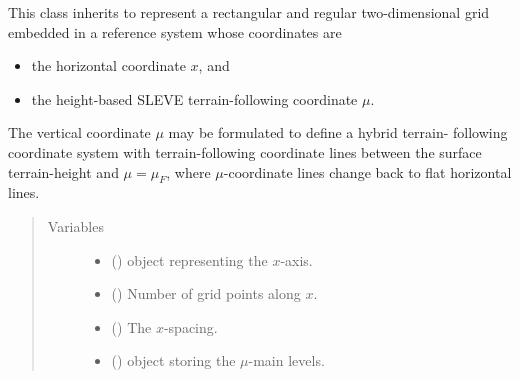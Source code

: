\documentclass[letterpaper,10pt,english]{sphinxmanual}
\begin{document}
\begin{fulllineitems}
\label{\detokenize{api:grids.sleve.SLEVE2d}}
This class inherits {\hyperref[\detokenize{api:grids.xz_grid.XZGrid}]{}} to represent a rectangular and regular
two-dimensional grid embedded in a reference system whose coordinates are
\begin{itemize}
\item {} 
the horizontal coordinate \(x\), and

\item {} 
the height-based SLEVE terrain-following coordinate \(\mu\).

\end{itemize}

The vertical coordinate \(\mu\) may be formulated to define a hybrid terrain-
following coordinate system with terrain-following coordinate lines between the
surface terrain-height and \(\mu = \mu_F\), where \(\mu\)-coordinate
lines change back to flat horizontal lines.
\begin{quote}\begin{description}
\item[{Variables}] \leavevmode\begin{itemize}
\item {} 
{\hyperref[\detokenize{api:grids.xyz_grid.XYZGrid.x}]{}} () \textendash{} {\hyperref[\detokenize{api:grids.axis.Axis}]{}} object representing the \(x\)-axis.

\item {} 
{\hyperref[\detokenize{api:grids.xyz_grid.XYZGrid.nx}]{}} () \textendash{} Number of grid points along \(x\).

\item {} 
{\hyperref[\detokenize{api:grids.xyz_grid.XYZGrid.dx}]{}} () \textendash{} The \(x\)-spacing.

\item {} 
 () \textendash{} {\hyperref[\detokenize{api:grids.axis.Axis}]{}} object storing the \(\mu\)-main levels.


\end{itemize}
\end{description}
\end{quote}
\end{fulllineitems}
\end{document}
